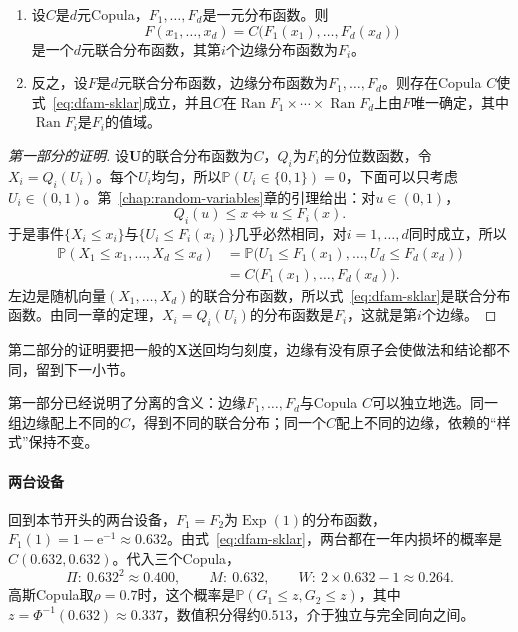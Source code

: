 \begin{theorem}[Sklar定理]
\label{thm:dfam-sklar}
\begin{enumerate}
  \item 设$C$是$d$元Copula，$F_1,\dots,F_d$是一元分布函数。则
  \begin{equation}
    F(x_1,\dots,x_d)=C\bigl(F_1(x_1),\dots,F_d(x_d)\bigr)
    \label{eq:dfam-sklar}
  \end{equation}
  是一个$d$元联合分布函数，其第$i$个边缘分布函数为$F_i$。
  \item 反之，设$F$是$d$元联合分布函数，边缘分布函数为$F_1,\dots,F_d$。则存在Copula $C$使式~\eqref{eq:dfam-sklar}成立，并且$C$在$\operatorname{Ran}F_1\times\cdots\times\operatorname{Ran}F_d$上由$F$唯一确定，其中$\operatorname{Ran}F_i$是$F_i$的值域。
\end{enumerate}
\end{theorem}

\begin{proof}[第一部分的证明]
设$\bm{U}$的联合分布函数为$C$，$Q_i$为$F_i$的分位数函数，令$X_i=Q_i(U_i)$。每个$U_i$均匀，所以$\mathbb{P}(U_i\in\{0,1\})=0$，下面可以只考虑$U_i\in(0,1)$。第~\ref{chap:random-variables}章的引理给出：对$u\in(0,1)$，
\[
  Q_i(u)\leq x\iff u\leq F_i(x).
\]
于是事件$\{X_i\leq x_i\}$与$\{U_i\leq F_i(x_i)\}$几乎必然相同，对$i=1,\dots,d$同时成立，所以
\[
  \begin{aligned}
    \mathbb{P}(X_1\leq x_1,\dots,X_d\leq x_d)&=\mathbb{P}\bigl(U_1\leq F_1(x_1),\dots,U_d\leq F_d(x_d)\bigr)\\
    &=C\bigl(F_1(x_1),\dots,F_d(x_d)\bigr).
  \end{aligned}
\]
左边是随机向量$(X_1,\dots,X_d)$的联合分布函数，所以式~\eqref{eq:dfam-sklar}是联合分布函数。由同一章的定理，$X_i=Q_i(U_i)$的分布函数是$F_i$，这就是第$i$个边缘。
\end{proof}

第二部分的证明要把一般的$\bm{X}$送回均匀刻度，边缘有没有原子会使做法和结论都不同，留到下一小节。

第一部分已经说明了分离的含义：边缘$F_1,\dots,F_d$与Copula $C$可以独立地选。同一组边缘配上不同的$C$，得到不同的联合分布；同一个$C$配上不同的边缘，依赖的“样式”保持不变。

\paragraph{两台设备}
回到本节开头的两台设备，$F_1=F_2$为$\operatorname{Exp}(1)$的分布函数，$F_1(1)=1-\mathrm{e}^{-1}\approx0.632$。由式~\eqref{eq:dfam-sklar}，两台都在一年内损坏的概率是$C(0.632,0.632)$。代入三个Copula，
\[
  \Pi:\ 0.632^{2}\approx0.400,\qquad M:\ 0.632,\qquad W:\ 2\times0.632-1\approx0.264 .
\]
高斯Copula取$\rho=0.7$时，这个概率是$\mathbb{P}(G_1\leq z,G_2\leq z)$，其中$z=\Phi^{-1}(0.632)\approx0.337$，数值积分得约$0.513$，介于独立与完全同向之间。

